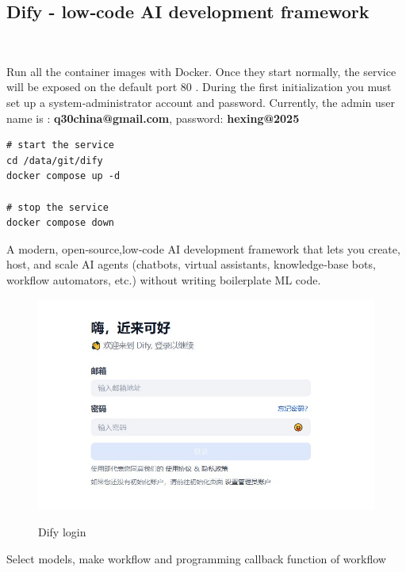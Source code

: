 
\subsection{ Dify - low‑code AI development framework }\

Run all the container images with Docker. Once they start normally, the service will be exposed on the default port 80 . During the first initialization you must set up a system‑administrator account and password. Currently, the admin user name is : \textbf{q30china@gmail.com}, password:\textbf{ hexing@2025}

\vspace{0.5cm}

\begin{lstlisting}
# start the service
cd /data/git/dify
docker compose up -d

# stop the service
docker compose down
\end{lstlisting}

\vspace{0.5cm}

A modern, open‑source,low‑code AI development framework that lets you create, host, and scale AI agents (chatbots, virtual assistants, knowledge‑base bots, workflow automators, etc.) without writing boilerplate ML code.

\begin{figure}[H]
    \begin{center}
        \includegraphics[width=.95\linewidth]{res/dify-login.jpg}\\
        \caption{Dify login }\label{dify-login}
    \end{center}
\end{figure}

Select models, make workflow and programming callback function of workflow

